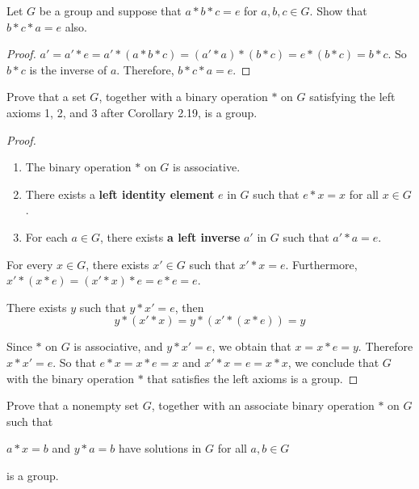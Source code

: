 \newpage
\begin{exercise}
    Let $G$ be a group and suppose that $a * b * c = e$ for $a, b, c\in G$. Show that $b * c * a = e$ also.
\end{exercise}

\begin{proof}
    $a' = a' * e = a' * (a * b * c) = (a' * a) * (b * c) = e * (b * c) = b * c$. So $b * c$ is the inverse of $a$. Therefore, $b * c * a = e$.
\end{proof}

\newpage
\begin{exercise}
    Prove that a set $G$, together with a binary operation $*$ on $G$ satisfying the left axioms 1, 2, and 3 after Corollary 2.19, is a group.
\end{exercise}

\begin{proof}
    \begin{enumerate}[label={\textbf{Axiom \arabic*.}},itemindent=1cm]
        \item The binary operation $*$ on $G$ is associative.
        \item There exists a \textbf{left identity element} $e$ in $G$ such that $e * x = x$ for all $x\in G$.
        \item For each $a\in G$, there exists \textbf{a left inverse} $a'$ in $G$ such that $a' * a = e$.
    \end{enumerate}

    For every $x\in G$, there exists $x'\in G$ such that $x' * x = e$. Furthermore, $x' * (x * e) = (x' * x) * e = e * e = e$.

    There exists $y$ such that $y * x' = e$, then
    \[
        y * (x' * x) = y * (x' * (x * e)) = y
    \]

    Since $*$ on $G$ is associative, and $y * x' = e$, we obtain that $x = x * e = y$. Therefore $x * x' = e$. So that $e * x = x * e = x$ and $x' * x = e = x * x$, we conclude that $G$ with the binary operation $*$ that satisfies the left axioms is a group.
\end{proof}

\newpage
\begin{exercise}
    Prove that a nonempty set $G$, together with an associate binary operation $*$ on $G$ such that
    \begin{center}
        $a * x = b$ and $y * a = b$ have solutions in $G$ for all $a, b\in G$
    \end{center}

    is a group.
\end{exercise}

